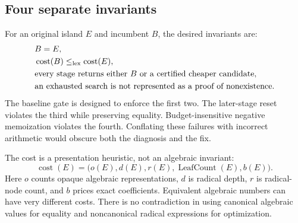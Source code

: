 \documentclass[11pt,a4paper]{article}
\newcommand{\cost}{\operatorname{cost}}\newcommand{\depth}{\operatorname{depth}}
\theoremstyle{definition}\newtheorem{definition}[proposition]{Definition}
\theoremstyle{remark}\newtheorem{remark}[proposition]{Remark}
\begin{document}
\subsection{Four separate invariants}
For an original island $E$ and incumbent $B$, the desired invariants are:
\begin{align}
& B=E, \label{eq:semantic-invariant}\\
& \cost(B)\leq_{\rm lex}\cost(E),\label{eq:cost-invariant}\\
& \text{every stage returns either }B\text{ or a certified cheaper candidate},
\label{eq:stage-invariant}\\
& \text{an exhausted search is not represented as a proof of nonexistence}.
\label{eq:search-invariant}
\end{align}
The baseline gate is designed to enforce the first two. The later-stage reset
violates the third while preserving equality. Budget-insensitive negative
memoization violates the fourth. Conflating these failures with incorrect
arithmetic would obscure both the diagnosis and the fix.

The cost is a presentation heuristic, not an algebraic invariant:
\begin{equation}
\cost(E)=\bigl(o(E),d(E),r(E),\operatorname{LeafCount}(E),b(E)\bigr).
\end{equation}
Here $o$ counts opaque algebraic representations, $d$ is radical depth, $r$ is
radical-node count, and $b$ prices exact coefficients. Equivalent algebraic
numbers can have very different costs. There is no contradiction in using
canonical algebraic values for equality and noncanonical radical expressions
for optimization.
\end{document}
